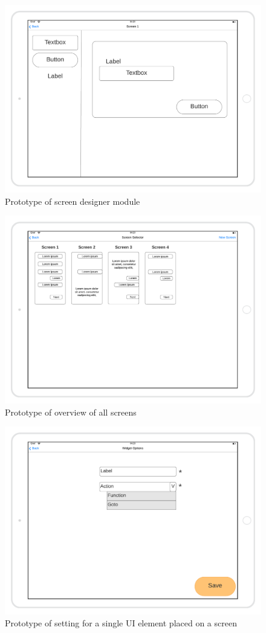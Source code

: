 \begin{figure}[H]
    \includegraphics[width=\textwidth]{images/Design-a-screen-mockup.png}
    \caption{Prototype of screen designer module}
\end{figure}

\begin{figure}[H]
    \includegraphics[width=\textwidth]{images/screens-mockup.png}
    \caption{Prototype of overview of all screens}
\end{figure}

\begin{figure}[H]
    \includegraphics[width=\textwidth]{images/ui-element-settings-mockup.png}
    \caption{Prototype of setting for a single UI element placed on a screen}
\end{figure}